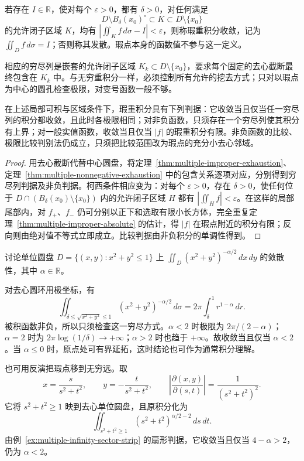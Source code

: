 \begin{definition}
\label{def:multiple-singular-integral}
若存在 $I\in\mathbb R$，使对每个 $\varepsilon>0$，都有 $\delta>0$，对任何满足
\[
    D\setminus B_\delta(x_0)^\circ\subset K\subset D\setminus\{x_0\}
\]
的允许闭子区域 $K$，均有 $|\iint_Kf\,d\sigma-I|<\varepsilon$，则称瑕重积分收敛，记为 $\iint_Df\,d\sigma=I$；否则称其发散。瑕点本身的函数值不参与这一定义。
\end{definition}

相应的穷尽列是嵌套的允许闭子区域 $K_k\subset D\setminus\{x_0\}$，要求每个固定的去心截断最终包含在 $K_k$ 中。与无穷重积分一样，必须控制所有允许的挖去方式；只对以瑕点为中心的圆孔检查极限，对变号函数一般不够。

\begin{theorem}
\label{thm:multiple-singular-criteria}
在上述局部可积与区域条件下，瑕重积分具有下列判据：它收敛当且仅当任一穷尽列的积分都收敛，且此时各极限相同；对非负函数，只须存在一个穷尽列使其积分有上界；对一般实值函数，收敛当且仅当 $|f|$ 的瑕重积分有限。非负函数的比较、极限比较判别法仍成立，只须把比较范围改为瑕点的充分小去心邻域。
\end{theorem}
\begin{proof}
用去心截断代替中心圆盘，将定理~\ref{thm:multiple-improper-exhaustion}、定理~\ref{thm:multiple-nonnegative-exhaustion} 中的包含关系逐项对应，分别得到穷尽列判据及非负判据。柯西条件相应变为：对每个 $\varepsilon>0$，存在 $\delta>0$，使任何位于 $D\cap(B_\delta(x_0)\setminus\{x_0\})$ 内的允许闭子区域 $H$ 都有 $|\iint_Hf|<\varepsilon$。在这样的局部尾部内，对 $f_+$、$f_-$ 仍可分别以正下和选取有限小长方体，完全重复定理~\ref{thm:multiple-improper-absolute} 的估计，得 $|f|$ 在瑕点附近的积分有限；反向则由绝对值不等式立即成立。比较判据由非负积分的单调性得到。
\end{proof}

\begin{example}
\label{ex:multiple-singular-radial-power}
讨论单位圆盘 $D=\{(x,y):x^2+y^2\leq1\}$ 上 $\displaystyle\iint_D(x^2+y^2)^{-\alpha/2}\,dx\,dy$ 的敛散性，其中 $\alpha\in\mathbb R$。
\end{example}
\begin{solve}
对去心圆环用极坐标，有
\[
    \iint_{\delta\leq\sqrt{x^2+y^2}\leq1}
    (x^2+y^2)^{-\alpha/2}\,d\sigma
    =2\pi\int_\delta^1r^{1-\alpha}\,dr.
\]
被积函数非负，所以只须检查这一穷尽方式。$\alpha<2$ 时极限为 $2\pi/(2-\alpha)$；$\alpha=2$ 时为 $2\pi\log(1/\delta)\to+\infty$；$\alpha>2$ 时也趋于 $+\infty$。故收敛当且仅当 $\alpha<2$。当 $\alpha\leq0$ 时，原点处可有界延拓，这时结论也可作为通常积分理解。

也可用反演把瑕点移到无穷远。取
\[
    x=\frac{s}{s^2+t^2},\qquad y=-\frac{t}{s^2+t^2},\qquad
    \left|\frac{\partial(x,y)}{\partial(s,t)}\right|
    =\frac1{(s^2+t^2)^2}.
\]
它将 $s^2+t^2\geq1$ 映到去心单位圆盘，且原积分化为
\[
    \iint_{s^2+t^2\geq1}(s^2+t^2)^{\alpha/2-2}\,ds\,dt.
\]
由例~\ref{ex:multiple-infinity-sector-strip} 的扇形判据，它收敛当且仅当 $4-\alpha>2$，仍为 $\alpha<2$。
\end{solve}

